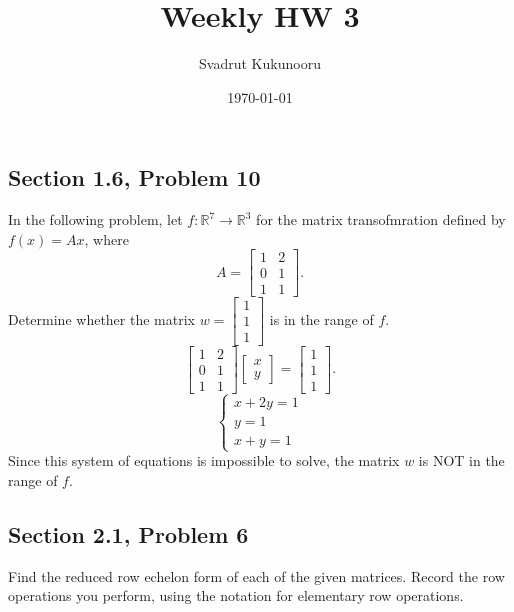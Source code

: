 \documentclass[letterpaper]{report}
\title{Weekly HW 3}
\author{Svadrut Kukunooru}
\date{\today}
\begin{document}
\begin{titlepage}
    \maketitle
\end{titlepage}

\subsection{Section 1.6, Problem 10}%
\label{sub:Section 1.6, Problem 10}
In the following problem, let $f : \mathbb{R}^7 \to \mathbb{R}^3$ for the matrix transofmration defined by $f(x) = Ax$, where 
\[
A = 
\begin{bmatrix} 
    1 & 2 \\
    0 & 1 \\
    1 & 1
\end{bmatrix} 
.\] 
Determine whether the matrix $w = \begin{bmatrix} 
1 \\ 1 \\ 1
\end{bmatrix}$ is in the range of $f$.
\[
\begin{bmatrix} 
    1 & 2 \\
    0 & 1 \\
    1 & 1
\end{bmatrix} 
\begin{bmatrix} 
x \\ y
\end{bmatrix} = 
\begin{bmatrix} 
1 \\ 1 \\ 1
\end{bmatrix} 
.\] 
\begin{equation}
    \begin{cases}
        x + 2y = 1 \\
        y = 1 \\
        x + y = 1
    \end{cases}
\end{equation}
Since this system of equations is impossible to solve, the matrix $w$ is NOT in the range of $f$. 

\subsection{Section 2.1, Problem 6}%
\label{sub:Section 2.1, Problem 6}
Find the reduced row echelon form of each of the given matrices. Record the row operations you perform, using the notation for elementary row operations. 
\end{document}
